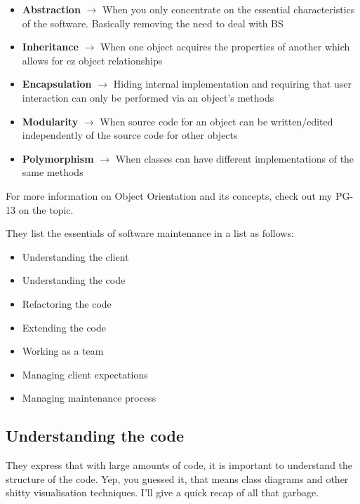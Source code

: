 \documentclass{article}
\begin{document}
\begin{itemize}
\item \textbf{Abstraction} $\longrightarrow$ When you only concentrate on the essential characteristics of the software. Basically removing the need to deal with BS
\item \textbf{Inheritance} $\longrightarrow$ When one object acquires the properties of another which allows for ez object relationships
\item \textbf{Encapsulation} $\longrightarrow$ Hiding internal implementation and requiring that user interaction can only be performed via an object's methods
\item \textbf{Modularity} $\longrightarrow$ When source code for an object can be written/edited independently of the source code for other objects
\item \textbf{Polymorphism} $\longrightarrow$ When classes can have different implementations of the same methods
\end{itemize}

For more information on Object Orientation and its concepts, check out my PG-13 \href{https://github.com/pedsm/team40/blob/master/PGP-OO/OOnotes.pdf}{\color{blue}{notes}} on the topic.

\newpage

They list the essentials of software maintenance in a list as follows: 

\begin{itemize}
\item Understanding the client
\item Understanding the code
\item Refactoring the code
\item Extending the code
\item Working as a team
\item Managing client expectations
\item Managing maintenance process
\end{itemize}

\subsection{Understanding the code}

They express that with large amounts of code, it is important to understand the structure of the code. Yep, you guessed it, that means class diagrams and other shitty visualisation techniques. I'll give a quick recap of all that garbage.
\end{document}
